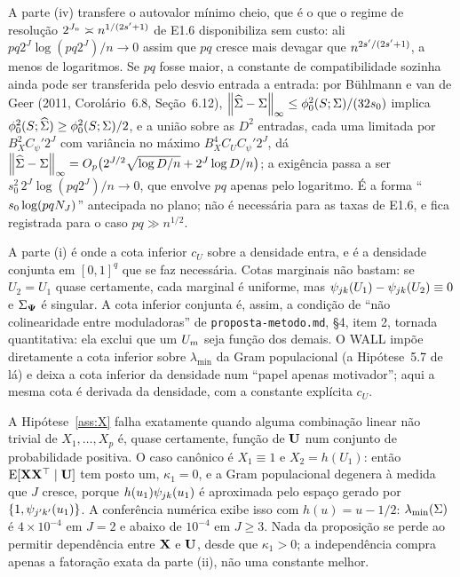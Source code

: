 \documentclass[11pt]{article}
\newcommand{\bPsi}{\boldsymbol{\Psi}}
\newcommand{\lmin}{\lambda_{\min}}
\begin{document}
\begin{remark}
\label{rem:cone}
A parte (iv) transfere o autovalor mínimo cheio, que é o que o regime de
resolução $2^{J_n} \asymp n^{1/(2s'+1)}$ de E1.6 disponibiliza sem custo: ali $p q 2^{J}\log(pq2^{J})/n \to 0$
assim que $p q$ cresce mais devagar que $n^{2s'/(2s'+1)}$, a menos de logaritmos. Se $pq$ fosse maior,
a constante de compatibilidade sozinha ainda pode ser transferida pelo desvio entrada a entrada: por
Bühlmann e van de Geer (2011, Corolário~6.8, Seção~6.12), $\left\lVert \widehat{\Sigma} - \Sigma \right\rVert_\infty \le \phi_{0}^2(S;\Sigma)/(32 s_0)$
implica $\phi_{0}^2(S; \widehat{\Sigma}) \ge \phi_{0}^2(S; \Sigma)/2$, e a união sobre as $D^2$ entradas, cada uma
limitada por $B_X^2 C_\psi' 2^{J}$ com variância no máximo $B_X^4 C_U C_\psi' 2^{J}$, dá
$\left\lVert \widehat{\Sigma} - \Sigma \right\rVert_\infty = O_p\bigl(2^{J/2}\sqrt{\log D/n} + 2^{J}\log D/n\bigr)$; a exigência passa a ser
$s_0^2\, 2^{J}\log(pq2^{J})/n \to 0$, que envolve $pq$ apenas pelo logaritmo. É a forma ``$s_0 \log(pqN_{J})$''
antecipada no plano; não é necessária para as taxas de E1.6, e fica registrada para o caso $pq \gg n^{1/2}$.
\end{remark}

\begin{remark}
\label{rem:joint}
A parte (i) é onde a cota inferior $c_U$ sobre a densidade entra, e é a densidade conjunta em $[0,1]^q$
que se faz necessária. Cotas marginais não bastam: se $U_2 = U_1$ quase certamente, cada marginal é
uniforme, mas $\psi_{jk}(U_1) - \psi_{jk}(U_2) \equiv 0$ e $\Gram_{\bPsi}$ é singular. A cota
inferior conjunta é, assim, a condição de ``não colinearidade entre moduladoras'' de
\texttt{proposta-metodo.md}, §4, item 2, tornada quantitativa: ela exclui que um $U_{m}$ seja função dos
demais. O WALL impõe diretamente a cota inferior sobre $\lmin$ da Gram populacional (a Hipótese~5.7 de lá)
e deixa a cota inferior da densidade num ``papel apenas motivador''; aqui a mesma cota é derivada da
densidade, com a constante explícita $c_U$.
\end{remark}

\begin{remark}
\label{rem:kappa}
A Hipótese~\ref{ass:X} falha exatamente quando alguma combinação linear não trivial de $X_1, \ldots, X_p$ é,
quase certamente, função de $\mathbf{U}$ num conjunto de probabilidade positiva. O caso canônico é
$X_1 \equiv 1$ e $X_2 = h(U_1)$: então $\mathrm{E}[\mathbf{X}\mathbf{X}^{\top} \mid \mathbf{U}]$ tem posto um, $\kappa_1 = 0$, e a
Gram populacional degenera à medida que $J$ cresce, porque $h(u_1)\psi_{jk}(u_1)$ é aproximada pelo
espaço gerado por $\{1, \psi_{j'k'}(u_1)\}$. A conferência numérica exibe isso com $h(u) = u - 1/2$:
$\lmin(\Gram)$ é $4\times 10^{-4}$ em $J = 2$ e abaixo de $10^{-4}$ em $J \ge 3$. Nada da proposição se perde
ao permitir dependência entre $\mathbf{X}$ e $\mathbf{U}$, desde que $\kappa_1 > 0$; a independência compra apenas a
fatoração exata da parte (ii), não uma constante melhor.
\end{remark}
\end{document}
